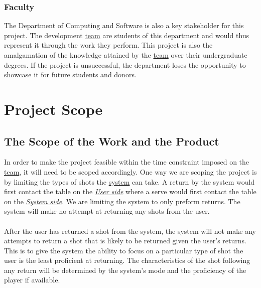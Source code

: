 \documentclass[11pt]{article}
\begin{document}
\subsubsection{Faculty}
The Department of Computing and Software is also a key stakeholder for this project. The development \hyperref[sec:definitions]{team} are students of this department and would thus represent it through the work they perform. This project is also the amalgamation of the knowledge attained by the \hyperref[sec:definitions]{team} over their undergraduate degrees. If the project is unsuccessful, the department loses the opportunity to showcase it for future students and donors.

\section{Project Scope}
\subsection{The Scope of the Work and the Product}
In order to make the project feasible within the time constraint imposed on the \hyperref[sec:definitions]{team}, it will need to be scoped accordingly. One way we are scoping the project is by limiting the types of shots the \hyperref[sec:definitions]{system} can take. A return by the system would first contact the table on the \hyperref[sec:definitions]{\textit{User side}} where a serve would first contact the table on the \hyperref[sec:definitions]{\textit{System side}}. We are limiting the system to only preform returns. The system will make no attempt at returning any shots from the user. \\\\
After the user has returned a shot from the system, the system will not make any attempts to return a shot that is likely to be returned given the user's returns. This is to give the system the ability to focus on a particular type of shot the user is the least proficient at returning. The characteristics of the shot following any return will be determined by the system's mode and the proficiency of the player if available.
\end{document}
